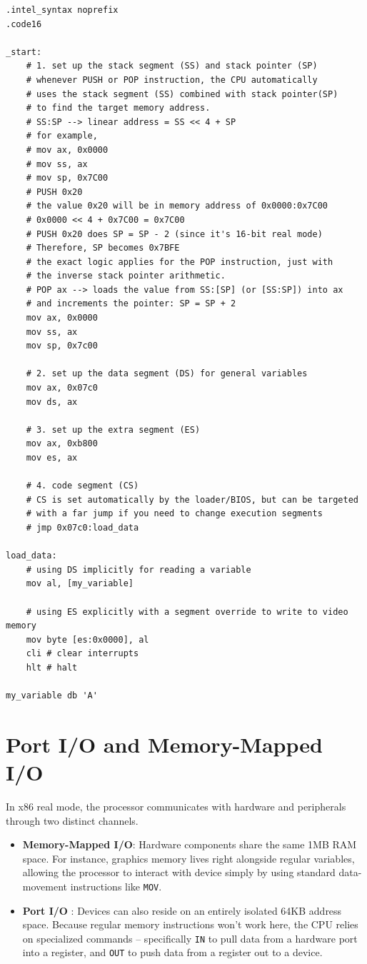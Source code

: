 \begin{lstlisting}[language=gas]
.intel_syntax noprefix
.code16

_start:
    # 1. set up the stack segment (SS) and stack pointer (SP)
    # whenever PUSH or POP instruction, the CPU automatically
    # uses the stack segment (SS) combined with stack pointer(SP)
    # to find the target memory address.
    # SS:SP --> linear address = SS << 4 + SP
    # for example,
    # mov ax, 0x0000
    # mov ss, ax
    # mov sp, 0x7C00
    # PUSH 0x20
    # the value 0x20 will be in memory address of 0x0000:0x7C00
    # 0x0000 << 4 + 0x7C00 = 0x7C00
    # PUSH 0x20 does SP = SP - 2 (since it's 16-bit real mode)
    # Therefore, SP becomes 0x7BFE
    # the exact logic applies for the POP instruction, just with
    # the inverse stack pointer arithmetic.
    # POP ax --> loads the value from SS:[SP] (or [SS:SP]) into ax
    # and increments the pointer: SP = SP + 2
    mov ax, 0x0000
    mov ss, ax
    mov sp, 0x7c00

    # 2. set up the data segment (DS) for general variables
    mov ax, 0x07c0
    mov ds, ax

    # 3. set up the extra segment (ES)
    mov ax, 0xb800
    mov es, ax

    # 4. code segment (CS)
    # CS is set automatically by the loader/BIOS, but can be targeted
    # with a far jump if you need to change execution segments
    # jmp 0x07c0:load_data

load_data:
    # using DS implicitly for reading a variable
    mov al, [my_variable]

    # using ES explicitly with a segment override to write to video memory
    mov byte [es:0x0000], al
    cli # clear interrupts
    hlt # halt

my_variable db 'A'
\end{lstlisting}

\section{Port I/O and Memory-Mapped I/O}

In x86 real mode, the processor communicates with hardware and peripherals
through two distinct channels.

\begin{itemize}
\tightlist
\item
  \textbf{Memory-Mapped I/O}: Hardware components share the same 1MB RAM space.
  For instance, graphics memory lives right alongside
  regular variables, allowing the processor to interact
  with device simply by using standard data-movement
  instructions like \texttt{MOV}.
\item
  \textbf{Port I/O} : Devices can also reside on an entirely isolated 64KB address
  space. Because regular memory instructions won't work here,
  the CPU relies on specialized commands -- specifically \texttt{IN}
  to pull data from a hardware port into a register, and \texttt{OUT}
  to push data from a register out to a device.
\end{itemize}

